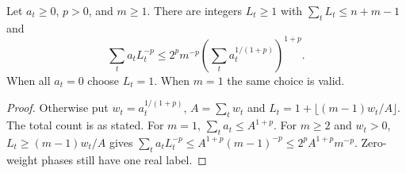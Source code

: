 \begin{lemma}\label{lem:integer}
Let $a_t\ge0$, $p>0$, and $m\ge1$. There are integers $L_t\ge1$ with $\sum_t L_t\le n+m-1$ and
\begin{equation}\label{eq:integer}
 \sum_t a_tL_t^{-p}\le 2^p m^{-p}
       \left(\sum_t a_t^{1/(1+p)}\right)^{1+p}.
\end{equation}
When all $a_t=0$ choose $L_t=1$. When $m=1$ the same choice is valid.
\end{lemma}
\begin{proof}
Otherwise put $w_t=a_t^{1/(1+p)}$, $A=\sum_tw_t$ and
$L_t=1+\lfloor(m-1)w_t/A\rfloor$. The total count is as stated. For $m=1$, $\sum_t a_t\le A^{1+p}$. For $m\ge2$ and $w_t>0$, $L_t\ge(m-1)w_t/A$ gives $\sum_ta_tL_t^{-p}\le A^{1+p}(m-1)^{-p}\le2^p A^{1+p}m^{-p}$. Zero-weight phases still have one real label.
\end{proof}


